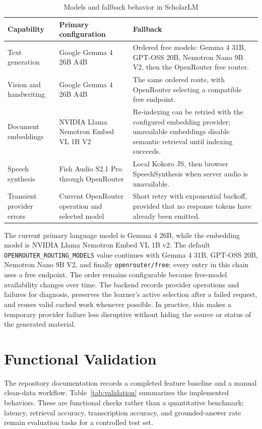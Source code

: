 \documentclass[conference]{IEEEtran}
\begin{document}
\begin{table}[t]
\caption{Models and fallback behavior in ScholarLM}
\label{tab:models}
\centering
\scriptsize
\begin{tabular}{p{} p{} p{}}
\toprule
\textbf{Capability} & \textbf{Primary configuration} & \textbf{Fallback}\\
\midrule
Text generation & Google Gemma 4 26B A4B & Ordered free models: Gemma 4 31B, GPT-OSS 20B, Nemotron Nano 9B V2, then the OpenRouter free router.\\
Vision and handwriting & Google Gemma 4 26B A4B & The same ordered route, with OpenRouter selecting a compatible free endpoint.\\
Document embeddings & NVIDIA Llama Nemotron Embed VL 1B V2 & Re-indexing can be retried with the configured embedding provider; unavailable embeddings disable semantic retrieval until indexing succeeds.\\
Speech synthesis & Fish Audio S2.1 Pro through OpenRouter & Local Kokoro JS, then browser SpeechSynthesis when server audio is unavailable.\\
Transient provider errors & Current OpenRouter operation and selected model & Short retry with exponential backoff, provided that no response tokens have already been emitted.\\
\bottomrule
\end{tabular}
\end{table}

The current primary language model is Gemma 4 26B, while the embedding model is NVIDIA Llama Nemotron Embed VL 1B v2. The default \texttt{OPENROUTER\_ROUTING\_MODELS} value continues with Gemma 4 31B, GPT-OSS 20B, Nemotron Nano 9B V2, and finally \texttt{openrouter/free}; every entry in this chain uses a free endpoint. The order remains configurable because free-model availability changes over time. The backend records provider operations and failures for diagnosis, preserves the learner's active selection after a failed request, and reuses valid cached work whenever possible. In practice, this makes a temporary provider failure less disruptive without hiding the source or status of the generated material.
\section{Functional Validation}
The repository documentation records a completed feature baseline and a manual clean-data workflow. Table~\ref{tab:validation} summarizes the implemented behaviors. These are functional checks rather than a quantitative benchmark; latency, retrieval accuracy, transcription accuracy, and grounded-answer rate remain evaluation tasks for a controlled test set.
\end{document}
